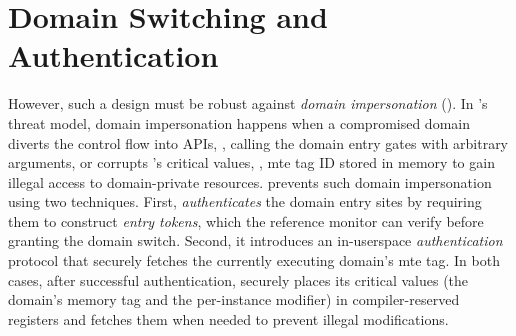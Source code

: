 \section{Domain Switching and Authentication}
\label{sec:design:impers}
However, such a design must be robust against  \emph{domain impersonation} (\srimpers).
In \thename's threat model, domain impersonation happens when a compromised domain diverts the control flow into \thename APIs, \eg, calling the domain entry gates with arbitrary arguments, or corrupts \thename's critical values, \eg, \gls{mte} tag ID stored in memory to gain illegal access to domain-private resources.
\thename prevents such domain impersonation using two techniques.
First, \thename \emph{authenticates} the domain entry sites by requiring them to construct \emph{entry tokens}, which the reference monitor can verify before granting the domain switch.
Second, it introduces an in-userspace \emph{authentication} protocol that securely fetches the currently executing domain's \gls{mte} tag.
In both cases, after successful authentication, \thename securely places its critical values (the domain's memory tag and the per-instance modifier) in compiler-reserved registers and fetches them when needed to prevent illegal modifications.




